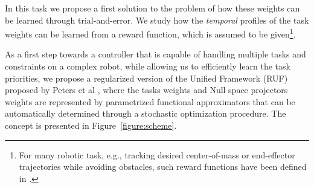 In this task we propose a first solution to the problem of how these weights can
be learned through trial-and-error. We study how the \textit{temporal} profiles
of the task weights can be learned from a reward function, which is assumed to
be given\footnote{For many robotic task, e.g., tracking desired center-of-mass
or end-effector trajectories while avoiding obstacles, such reward functions
have been defined in \cite{Kober_IJRR_2013}.}. 

As a first step towards a controller that is capable of handling multiple tasks
and constraints on a complex robot, while allowing us to efficiently learn the
task priorities, we propose a regularized version of the Unified Framework (RUF)
proposed by Peters et al \cite{Peters_AR_2008}, where the tasks weights and
Null space projectors weights are represented by parametrized functional
approximators that can be automatically determined through a stochastic
optimization procedure. The concept is presented in Figure~\ref{figure:scheme}.

